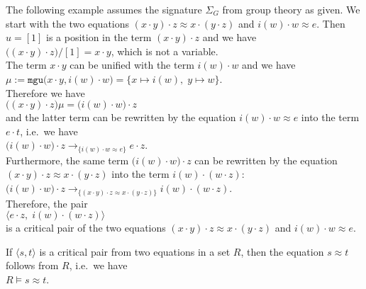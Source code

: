 \example
The following example assumes the signature $\Sigma_G$ from group theory as given.
We start with the two equations $(x \cdot y) \cdot z \approx x \cdot (y \cdot z)$ and $i(w) \cdot w \approx e$.
Then $u = [1]$ is a position in the term $(x \cdot y) \cdot z$ and we have
\\[0.2cm]
\hspace*{1.3cm}
$\bigl((x \cdot y) \cdot z\bigr)/[1] = x \cdot y$, which is not a variable.
\\[0.2cm]
The term $x \cdot y$ can be unified with the term $i(w) \cdot w$ and we have
\\[0.2cm]
\hspace*{1.3cm}
$\mu := \texttt{mgu}\bigl(x \cdot y, i(w) \cdot w\bigr) = \{ x \mapsto i(w),\; y \mapsto w \}$.
\\[0.2cm]
Therefore we have
\\[0.2cm]
\hspace*{1.3cm}
$\bigl((x \cdot y) \cdot z\bigr)\mu = \bigl(i(w) \cdot w\bigr) \cdot z$
\\[0.2cm]
and the latter term can be rewritten by the equation $i(w) \cdot w \approx e$ into the term $e \cdot t$,
i.e.~we have
\\[0.2cm]
\hspace*{1.3cm}
$\bigl(i(w) \cdot w\bigr) \cdot z \rightarrow_{\{ i(w) \cdot w \approx e\}} e \cdot z$.
\\[0.2cm]
Furthermore, the same term $\bigl(i(w) \cdot w\bigr) \cdot z$ can be rewritten by the equation
$(x \cdot y) \cdot z \approx x \cdot (y \cdot z)$ into the term $i(w) \cdot (w \cdot z)$:  
\\[0.2cm]
\hspace*{1.3cm}
$\bigl(i(w) \cdot w\bigr) \cdot z \rightarrow_{\{ (x \cdot y) \cdot z \approx x \cdot (y \cdot z)\}} i(w) \cdot (w \cdot z)$.
\\[0.2cm]
Therefore, the pair
\\[0.2cm]
\hspace*{1.3cm}
$\bigl\langle e \cdot z,\; i(w) \cdot (w \cdot z) \bigr\rangle$
\\[0.2cm]
is a critical pair of the two equations  $(x \cdot y) \cdot z \approx x \cdot (y \cdot z)$ and $i(w) \cdot w \approx e$.
\eox

\remark
If $\langle s, t\rangle$ is a critical pair from two equations in a set $R$, then the equation $s \approx t$
follows from $R$, i.e.~we have
\\[0.2cm]
\hspace*{1.3cm}
$R \models s \approx t$. \eox


